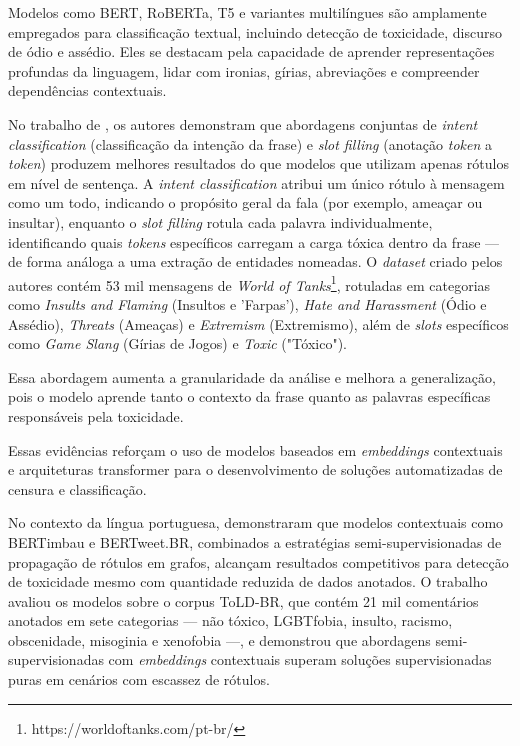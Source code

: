 \documentclass{eic-bcc-tcc}
\begin{document}
Modelos como BERT, RoBERTa, T5 e variantes multilíngues são amplamente empregados para classificação textual, incluindo detecção de toxicidade, discurso de ódio e assédio. Eles se destacam pela capacidade de aprender representações profundas da linguagem, lidar com ironias, gírias, abreviações e compreender dependências contextuais.

No trabalho de \cite{naseem-etal-2025-gametox}, os autores demonstram que abordagens conjuntas de \textit{intent classification} (classificação da intenção da frase) e \textit{slot filling} (anotação \textit{token} a \textit{token}) produzem melhores resultados do que modelos que utilizam apenas rótulos em nível de sentença. A \textit{intent classification} atribui um único rótulo à mensagem como um todo, indicando o propósito geral da fala (por exemplo, ameaçar ou insultar), enquanto o \textit{slot filling} rotula cada palavra individualmente, identificando quais \textit{tokens} específicos carregam a carga tóxica dentro da frase — de forma análoga a uma extração de entidades nomeadas. O \textit{dataset} criado pelos autores contém 53 mil mensagens de \textit{World of Tanks}\footnote{https://worldoftanks.com/pt-br/}, rotuladas em categorias como \textit{Insults and Flaming} (Insultos e 'Farpas'), \textit{Hate and Harassment} (Ódio e Assédio), \textit{Threats} (Ameaças) e \textit{Extremism} (Extremismo), além de \textit{slots} específicos como \textit{Game Slang} (Gírias de Jogos) e \textit{Toxic} ("Tóxico").

Essa abordagem aumenta a granularidade da análise e melhora a generalização, pois o modelo aprende tanto o contexto da frase quanto as palavras específicas responsáveis pela toxicidade.

Essas evidências reforçam o uso de modelos baseados em \textit{embeddings} contextuais e arquiteturas transformer para o desenvolvimento de soluções automatizadas de censura e classificação.

No contexto da língua portuguesa, \cite{ricarte2025contextual} demonstraram que modelos contextuais como BERTimbau e BERTweet.BR, combinados a estratégias semi-supervisionadas de propagação de rótulos em grafos, alcançam resultados competitivos para detecção de toxicidade mesmo com quantidade reduzida de dados anotados. O trabalho avaliou os modelos sobre o corpus ToLD-BR, que contém 21 mil comentários anotados em sete categorias — não tóxico, LGBTfobia, insulto, racismo, obscenidade, misoginia e xenofobia —, e demonstrou que abordagens semi-supervisionadas com \textit{embeddings} contextuais superam soluções supervisionadas puras em cenários com escassez de rótulos.
\end{document}
